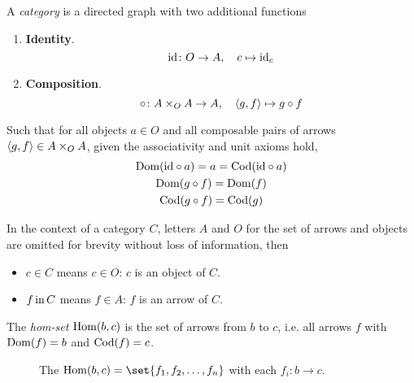 \begin{definition}[Category]
    A \textit{category} is a directed graph with two additional functions
    \begin{enumerate}
        \item \textbf{Identity}.
        \begin{equation}
            \mathrm{id} \colon O \to A, \quad c \mapsto \mathrm{id}_c
        \end{equation}
        \item \textbf{Composition}.
        \begin{equation}
            \circ \colon A \times_{O} A \to A, \quad \langle g, f \rangle \mapsto g \circ f
        \end{equation}
    \end{enumerate}
    
    Such that for all objects $a \in O$ and all composable pairs of arrows $\langle g, f \rangle \in A \times_{O} A$, given the associativity and unit axioms hold,
    \begin{gather}
        \mathrm{Dom}(\mathrm{id} \circ a) = a = \mathrm{Cod}(\mathrm{id} \circ a) \\
        \mathrm{Dom}(g \circ f) = \mathrm{Dom}(f) \\
        \mathrm{Cod}(g \circ f) = \mathrm{Cod}(g)
    \end{gather}
\end{definition}

\begin{remark}
    In the context of a category $C$, letters $A$ and $O$ for the set of arrows and objects are omitted for brevity without loss of information, then
    \begin{itemize}
        \item $c \in C$ means $c \in O$: $c$ is an object of $C$.
        \item $f \operatorname{\mathrm{in}} C$ means $f \in A$: $f$ is an arrow of $C$.
    \end{itemize}
\end{remark}

\begin{definition}
    The \textit{hom-set} $\mathrm{Hom}(b, c)$ is the set of arrows from $b$ to $c$, i.e. all arrows $f$ with $\mathrm{Dom}(f) = b$ and $\mathrm{Cod}(f) = c$.
    
    \begin{figure}[H]
        \centering
        \caption{The $\HomSet{b, c} = \set{ f_1, f_2, \dots, f_n }$ with each $f_i \colon b \to c$.}
        \label{fig:hom-set}
    \end{figure}
\end{definition}


